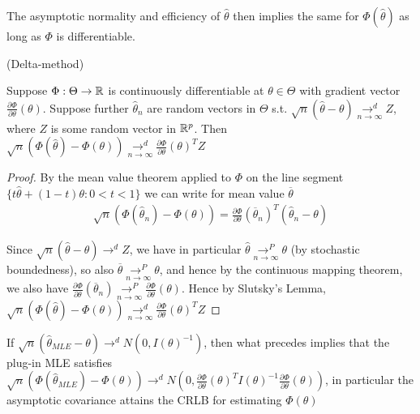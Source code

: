 \documentclass[a4paper]{article}
\begin{document}
The asymptotic normality and efficiency of  $\hat{\theta}$ then implies the same for $\Phi(\hat{\theta})$ as long as $\Phi$ is differentiable.

\begin{thm}(Delta-method)
	
	Suppose $\Phi : \Theta \to \mathbb{R}$ is continuously differentiable at $\theta \in \Theta$ with gradient vector $\frac{\partial\Phi}{\partial\theta}(\theta)$. Suppose further $\hat{\theta}_n$ are random vectors in $\Theta$ s.t. $\sqrt{n}(\hat{\theta} - \theta) \underset{n\to \infty}{\to ^{d}} Z $, where $Z$ is some random vector in  $\mathbb{R}^{p}$. Then $\sqrt{n}(\Phi(\hat{\theta}) - \Phi(\theta)) \underset{n\to \infty}{\to ^{d}} \frac{\partial\Phi}{\partial\theta}(\theta)^{T} Z$
\end{thm}

\begin{proof}
	By the mean value theorem applied to $\Phi$ on the line segment $\{t \hat{\theta} + (1-t)\theta : 0<t<1\} $ we can write for mean value $\overline{\theta}$
	\begin{align*}
		\sqrt{n}(\Phi(\hat{\theta}_n) - \Phi(\theta)) = \frac{\partial\Phi}{\partial\theta}(\overline{\theta}_n)^{T}(\hat{\theta}_n - \theta)
	\end{align*}

	Since $\sqrt{n}(\hat{\theta} - \theta) \to ^{d} Z $, we have in particular $\hat{\theta} \underset{n\to \infty}{\to ^{P}} \theta$ (by stochastic boundedness), so also $\overline{\theta} \underset{n\to \infty}{\to ^{P}} \theta$, and hence by the continuous mapping theorem, we also have $\frac{\partial\Phi}{\partial\theta}(\overline{\theta}_n) \underset{n\to \infty}{\to ^{P}} \frac{\partial\Phi}{\partial\theta} (\theta)$. Hence by Slutsky's Lemma, $\sqrt{n}(\Phi(\hat{\theta}) - \Phi(\theta)) \underset{n\to \infty}{\to ^{d}} \frac{\partial\Phi}{\partial\theta}(\theta)^{T} Z$ 
	
\end{proof}

\begin{remark}
	If $\sqrt{n}( \hat{\theta}_{MLE} - \theta) \to ^{d} N(0, I(\theta)^{-1})$, then what precedes implies that the plug-in MLE satisfies $\sqrt{n} (\Phi(\hat{\theta}_{MLE}) - \Phi(\theta)) \to ^{d} N\left(0, \frac{\partial\Phi}{\partial\theta}(\theta)^{T} I(\theta)^{-1} \frac{\partial\Phi}{\partial\theta}(\theta)\right)$, in particular the asymptotic covariance attains the CRLB for estimating $\Phi(\theta)$
	
\end{remark}
\end{document}
